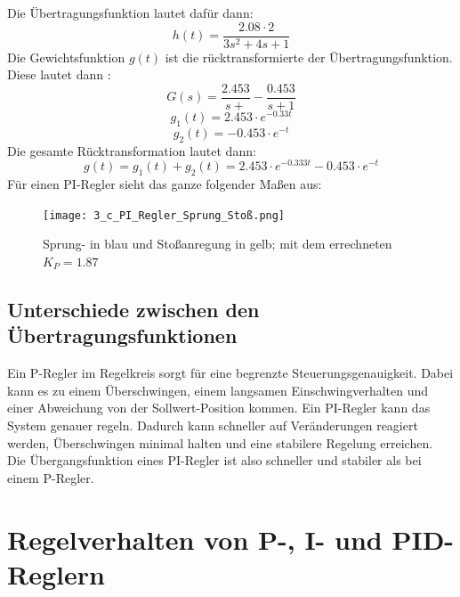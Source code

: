 \documentclass{article}
\begin{document}
\newpage
			Die Übertragungsfunktion lautet dafür dann:
			$$h(t) = \frac{2.08 \cdot 2}{3s^2 + 4s + 1}$$
			Die Gewichtsfunktion $g(t)$ ist die rücktransformierte der Übertragungsfunktion. \\
			Diese lautet dann :
			$$G(s) = \frac{2.453}{s+} - \frac{0.453}{s+1}$$
\vspace{2mm}	
			$$g_1(t) = 2.453 \cdot e^{-0.33t}$$
\vspace{0mm}
			$$g_2(t) = -0.453 \cdot e^{-t}$$
\vspace{1mm}
			Die gesamte Rücktransformation lautet dann:
			$$g(t) = g_1(t) + g_2(t) = 2.453 \cdot e^{-0.333t} - 0.453 \cdot e^{-t}$$
\vspace{3mm}
			Für einen PI-Regler sieht das ganze folgender Maßen aus:
			\begin{figure}[h]
				\texttt{[image: 3\_c\_PI\_Regler\_Sprung\_Stoß.png]}
				\caption{Sprung- in blau und Stoßanregung in gelb; mit dem errechneten $K_P = 1.87$}
				\label{fig32: Sprung. und Stoßantwort}
			\end{figure}	
			
		\subsection{Unterschiede zwischen den Übertragungsfunktionen}
		Ein P-Regler im Regelkreis sorgt für eine begrenzte Steuerungsgenauigkeit. Dabei kann es zu einem Überschwingen, einem langsamen Einschwingverhalten und einer Abweichung von der Sollwert-Position kommen.
		Ein PI-Regler kann das System genauer regeln. Dadurch kann schneller auf Veränderungen reagiert werden, Überschwingen minimal halten und eine stabilere Regelung erreichen.\\
		Die Übergangsfunktion eines PI-Regler ist also schneller und stabiler als bei einem P-Regler.
\newpage
	\section{Regelverhalten von P-, I- und PID-Reglern}
\end{document}
